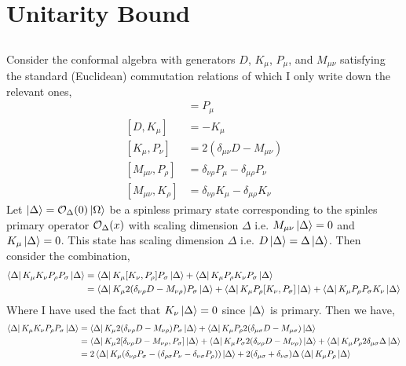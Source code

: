 \documentclass[12pt]{article}
\begin{document}

\section{Unitarity Bound}

\subsection{}

Consider the conformal algebra with generators $D$, $K_\mu$, $P_\mu$, and $M_{\mu \nu}$ satisfying the standard (Euclidean) commutation relations of which I only write down the relevant ones,
\begin{align*}
[ D, P_\mu] & = P_\mu 
\\
[ D, K_\mu] & = - K_\mu
\\
[ K_\mu, P_\nu] & = 2 \left( \delta_{\mu \nu} D -  M_{\mu \nu} \right)
\\
[M_{\mu \nu}, P_\rho] & =  
\delta_{\nu \rho} P_\mu  - \delta_{\mu \rho} P_\nu 
\\
[M_{\mu \nu}, K_{\rho}] & =  \delta_{\nu \rho} K_\mu  - \delta_{\mu \rho} K_\nu  
\end{align*}
Let $\left| \Delta \right> = \mathcal{O}_\Delta(0) \left| \Omega \right>$ be a spinless primary state corresponding to the spinles primary operator $\mathcal{O}_\Delta(x)$ with scaling dimension $\Delta$ i.e. $M_{\mu \nu} \left| \Delta \right> = 0$ and $K_\mu \left| \Delta \right> = 0$. This state has scaling dimension $\Delta$ i.e. $D \left| \Delta \right> = \Delta \left| \Delta \right>$. Then consider the combination,
\begin{align*}
\left< \Delta \right| K_\mu K_{\nu} P_{\rho} P_{\sigma} \left| \Delta \right> & = \left< \Delta \right| K_\mu [ K_{\nu}, P_{\rho}] P_{\sigma} \left| \Delta \right> + \left< \Delta \right| K_\mu  P_{\rho} K_{\nu} P_{\sigma} \left| \Delta \right>
\\
& = \left< \Delta \right| K_\mu 2 (\delta_{\nu \rho} D - M_{\nu \rho}) P_{\sigma} \left| \Delta \right> + \left< \Delta \right| K_\mu  P_{\rho} [K_{\nu}, P_{\sigma}]\left| \Delta \right> + \left< \Delta \right| K_\mu  P_{\rho}  P_{\sigma}  K_{\nu}\left| \Delta \right>
\end{align*}
Where I have used the fact that $K_\nu \left| \Delta \right> = 0$ since $\left| \Delta \right>$ is primary.
Then we have,
\begin{align*}
\left< \Delta \right| K_\mu K_{\nu} P_{\rho} P_{\sigma} \left| \Delta \right> 
& = \left< \Delta \right| K_\mu 2 (\delta_{\nu \rho} D - M_{\nu \rho}) P_{\sigma} \left| \Delta \right> + \left< \Delta \right| K_\mu  P_{\rho} 2 (\delta_{\mu \sigma} D - M_{\mu \sigma} ) \left| \Delta \right> 
\\
& = \left< \Delta \right| K_\mu 2 [\delta_{\nu \rho} D - M_{\nu \rho}, P_{\sigma}] \left| \Delta \right> + \left< \Delta \right| K_\mu P_{\sigma} 2 (\delta_{\nu \rho} D - M_{\nu \rho})  \left| \Delta \right> + \left< \Delta \right| K_\mu  P_{\rho} 2 \delta_{\mu \sigma} \Delta \left| \Delta \right> 
\\
& = 2 \left< \Delta \right| K_\mu (\delta_{\nu \rho} P_\sigma - (\delta_{\rho \sigma} P_\nu - \delta_{\nu \sigma} P_\rho))  \left| \Delta \right>  + 2 (\delta_{\mu \sigma} + \delta_{\nu \sigma}) \Delta \left< \Delta \right| K_\mu  P_{\rho}  \left| \Delta \right> 
\end{align*}
\end{document}

